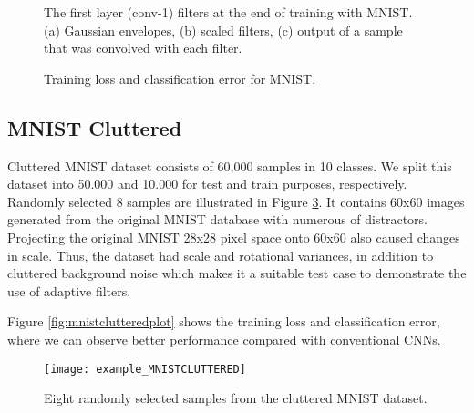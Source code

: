 \documentclass{bmvc2k}
\begin{document}
\begin{figure}
	\centering
	\caption{The first layer (conv-1) filters at the end of training with MNIST. (a) Gaussian envelopes, (b) scaled filters, (c) output of a sample that was convolved with each filter.}
	\label{fig:mnistfilt1}
\end{figure}

\begin{figure}
	\centering 
	\caption{Training loss and classification error for MNIST.}
	\label{fig:mnistplot}
\end{figure}


\subsection{MNIST Cluttered}
\label{mnistclut}
Cluttered MNIST dataset \cite{mnistcluttered} consists of 60,000 samples in 10 classes. We split this dataset into 50.000 and 10.000 for test and train purposes, respectively. Randomly selected 8 samples are illustrated in Figure \ref{fig:abc}. It contains 60x60 images generated from the original MNIST database with numerous of distractors. Projecting the original MNIST 28x28 pixel space onto 60x60 also caused changes in scale. Thus, the dataset had scale and rotational variances, in addition to cluttered background noise which makes it a suitable test case to demonstrate the use of adaptive filters.

Figure \ref{fig:mnistclutteredplot} shows the training loss and classification error, where we can observe better performance compared with conventional CNNs.

\begin{figure}
	\centering
	\texttt{[image: example\_MNISTCLUTTERED]}
	\caption{Eight randomly selected samples from the cluttered MNIST dataset.}
	\label{fig:abc}
\end{figure}
\end{document}
